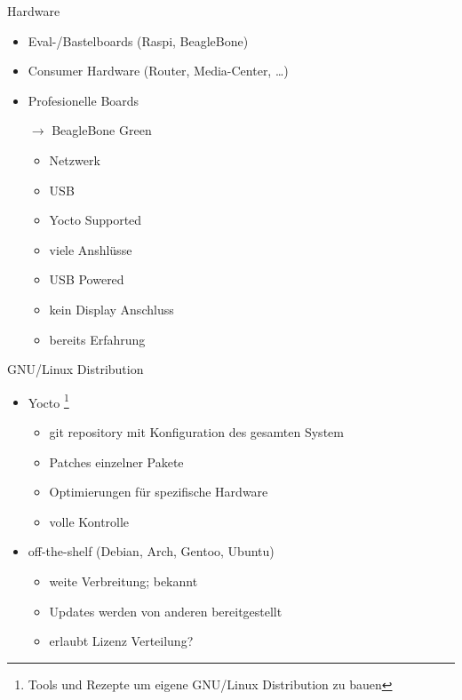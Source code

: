 \begin{frame}{Hardware}
	\begin{itemize}
		\item Eval-/Bastelboards (Raspi, BeagleBone)
		\item Consumer Hardware (Router, Media-Center, \ldots)
		\item Profesionelle Boards
		\item[$\rightarrow$] BeagleBone Green
		\begin{itemize}
			\item Netzwerk
			\item USB
			\item Yocto Supported
			\item viele Anshlüsse
			\item USB Powered
			\item kein Display Anschluss
			\item bereits Erfahrung
		\end{itemize}
	\end{itemize}
\end{frame}

\begin{frame}{GNU/Linux Distribution}
	\begin{itemize}
		\item Yocto\cite{whyYocto} \footnote{Tools und Rezepte um eigene GNU/Linux Distribution zu bauen}
		\begin{itemize}
			\item git repository mit Konfiguration des gesamten System
			\item Patches einzelner Pakete
			\item Optimierungen für spezifische Hardware
			\item volle Kontrolle
		\end{itemize}
		\item off-the-shelf (Debian, Arch, Gentoo, Ubuntu)
		\begin{itemize}
			\item weite Verbreitung; bekannt
			\item Updates werden von anderen bereitgestellt
			\item erlaubt Lizenz Verteilung?
		\end{itemize}
	\end{itemize}
\end{frame}
